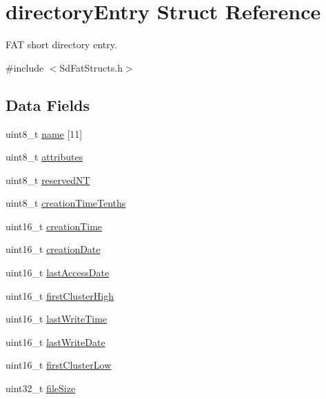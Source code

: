 \hypertarget{structdirectory_entry}{\section{directory\-Entry Struct Reference}
\label{structdirectory_entry}
}


F\-A\-T short directory entry.  




{\ttfamily \#include $<$Sd\-Fat\-Structs.\-h$>$}

\subsection*{Data Fields}
\begin{DoxyCompactItemize}
\item 
uint8\-\_\-t \hyperlink{structdirectory_entry_a30308c9b983377042fd2cc8900454fb1}{name} \mbox{[}11\mbox{]}
\item 
uint8\-\_\-t \hyperlink{structdirectory_entry_a983149395439fbc9ca8497076b75fd6b}{attributes}
\item 
uint8\-\_\-t \hyperlink{structdirectory_entry_a937b2d2e4b78ddf9e42b19c754e4f31a}{reserved\-N\-T}
\item 
uint8\-\_\-t \hyperlink{structdirectory_entry_a088ac767e59feb38599e0a53e6aacb82}{creation\-Time\-Tenths}
\item 
uint16\-\_\-t \hyperlink{structdirectory_entry_a2b2b18a3fb988470278b1217abe946ab}{creation\-Time}
\item 
uint16\-\_\-t \hyperlink{structdirectory_entry_ab00be6268bf4c4f4b6014f056e27ba45}{creation\-Date}
\item 
uint16\-\_\-t \hyperlink{structdirectory_entry_a5635857642ec25e070355257115dafd1}{last\-Access\-Date}
\item 
uint16\-\_\-t \hyperlink{structdirectory_entry_ad6224dfa27a1c558703f158e93ceafe0}{first\-Cluster\-High}
\item 
uint16\-\_\-t \hyperlink{structdirectory_entry_ab140bb773b2ff0ddf7199efc083ce037}{last\-Write\-Time}
\item 
uint16\-\_\-t \hyperlink{structdirectory_entry_a26f462d6e4410d502149973ee6c216fd}{last\-Write\-Date}
\item 
uint16\-\_\-t \hyperlink{structdirectory_entry_a3a4f70fb49494208d7eb349969a8acaa}{first\-Cluster\-Low}
\item 
uint32\-\_\-t \hyperlink{structdirectory_entry_a48f46ad02b77a00b795d15626ba1d42e}{file\-Size}
\end{DoxyCompactItemize}


